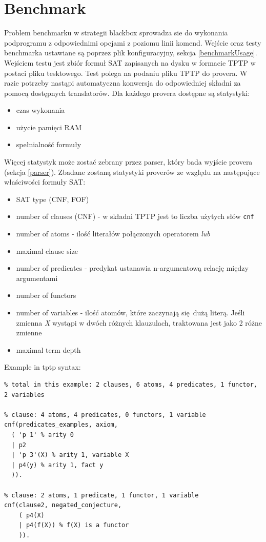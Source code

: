 \documentclass[a4paper,12pt]{article}
\begin{document}
\section{Benchmark}

Problem benchmarku w strategii blackbox sprowadza sie do wykonania podprogramu z odpowiednimi opcjami z poziomu linii komend.
Wejście oraz testy benchmarka ustawiane są poprzez plik konfiguracyjny, sekcja \ref{benchmarkUsage}.  Wejściem testu jest zbiór formuł \gls{SAT} zapisanych na dysku w formacie TPTP w postaci pliku tesktowego. Test polega na podaniu pliku TPTP do provera. W razie potrzeby nastąpi automatyczna konwersja do odpowiedniej składni za pomocą dostępnych translatorów.
Dla każdego provera dostępne są statystyki:

\begin{itemize}
  \item czas wykonania
  \item użycie pamięci RAM
  \item spełnialność formuły
\end{itemize}

\noindent
Więcej statystyk może zostać zebrany przez parser, który bada wyjście provera (sekcja \ref{parser}).
\newline
Zbadane zostaną statystyki proverów ze względu na następujące właściwości formuły SAT:

\begin{itemize}
  \item SAT type (CNF, FOF)
  \item number of clauses (CNF) - w składni TPTP jest to liczba użytych słów \texttt{cnf}
  \item number of atoms - ilość literałów połączonych operatorem \textit{lub}
  \item maximal clause size
  \item number of predicates - predykat ustanawia n-argumentową relację między argumentami
  \item number of functors
  \item number of variables - ilość atomów, które zaczynają się dużą literą. Jeśli zmienna \textit{X} wystąpi w dwóch różnych klauzulach, traktowana jest jako 2 różne zmienne
  \item maximal term depth
\end{itemize}

Example in tptp syntax:

\begin{verbatim}
% total in this example: 2 clauses, 6 atoms, 4 predicates, 1 functor, 2 variables

% clause: 4 atoms, 4 predicates, 0 functors, 1 variable
cnf(predicates_examples, axiom,
  ( 'p 1' % arity 0
  | p2
  | 'p 3'(X) % arity 1, variable X
  | p4(y) % arity 1, fact y
  )).

% clause: 2 atoms, 1 predicate, 1 functor, 1 variable
cnf(clause2, negated_conjecture,
    ( p4(X)
    | p4(f(X)) % f(X) is a functor
    )).

\end{verbatim}
\end{document}
